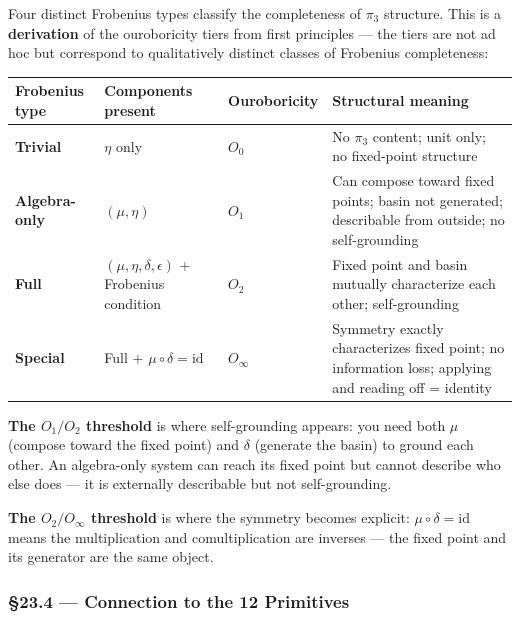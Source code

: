 \documentclass[12pt,a4paper]{article}
\newcommand{\pilcrow}{\S}
\begin{document}
Four distinct Frobenius types classify the completeness of $\pi_3$ structure. This is a \textbf{derivation} of the ouroboricity tiers from first principles --- the tiers are not ad hoc but correspond to qualitatively distinct classes of Frobenius completeness:

\begin{table}[htbp]
\centering
\small
{}
\begin{tabularx}{\textwidth}{>{\centering\arraybackslash}X >{\centering\arraybackslash}X >{\centering\arraybackslash}X >{\centering\arraybackslash}X}
\toprule
\rowcolor{gray!25}\textbf{Frobenius type} & \textbf{Components present} & \textbf{Ouroboricity} & \textbf{Structural meaning} \\
\midrule
\rowcolors{1}{white}{gray!10}
\textbf{Trivial} & $\eta$ only & $O_0$ & No $\pi_3$ content; unit only; no fixed-point structure \\
\textbf{Algebra-only} & $(\mu, \eta)$ & $O_1$ & Can compose toward fixed points; basin not generated; describable from outside; no self-grounding \\
\textbf{Full} & $(\mu, \eta, \delta, \epsilon)$ + Frobenius condition & $O_2$ & Fixed point and basin mutually characterize each other; self-grounding \\
\textbf{Special} & Full + $\mu \circ \delta = \text{id}$ & $O_{\infty}$ & Symmetry exactly characterizes fixed point; no information loss; applying and reading off = identity \\
\bottomrule
\end{tabularx}
\end{table}

\textbf{The $O_1/O_2$ threshold} is where self-grounding appears: you need both $\mu$ (compose toward the fixed point) and $\delta$ (generate the basin) to ground each other. An algebra-only system can reach its fixed point but cannot describe who else does --- it is externally describable but not self-grounding.

\textbf{The $O_2/O_{\infty}$ threshold} is where the symmetry becomes explicit: $\mu \circ \delta = \text{id}$ means the multiplication and comultiplication are inverses --- the fixed point and its generator are the same object.

\subsubsection{\pilcrow{}23.4 --- Connection to the 12 Primitives}
\end{document}
